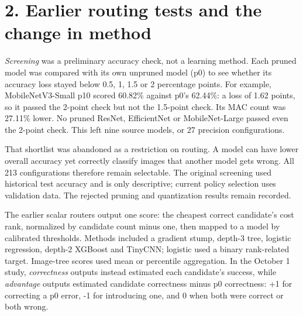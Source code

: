 \documentclass[10pt,a4paper]{article}
\newcommand{\pagehead}[1]{\section*{#1}}
\begin{document}
\newpage
\pagehead{2. Earlier routing tests and the change in method}
\textit{Screening} was a preliminary accuracy check, not a learning method. Each pruned model was compared with its own unpruned model (p0) to see whether its accuracy loss stayed below 0.5, 1, 1.5 or 2 percentage points. For example, MobileNetV3-Small p10 scored 60.82\% against p0's 62.44\%: a loss of 1.62 points, so it passed the 2-point check but not the 1.5-point check. Its MAC count was 27.11\% lower. No pruned ResNet, EfficientNet or MobileNet-Large passed even the 2-point check. This left nine source models, or 27 precision configurations.

That shortlist was abandoned as a restriction on routing. A model can have lower overall accuracy yet correctly classify images that another model gets wrong. All 213 configurations therefore remain selectable. The original screening used historical test accuracy and is only descriptive; current policy selection uses validation data. The rejected pruning and quantization results remain recorded.

The earlier scalar routers output one score: the cheapest correct candidate's cost rank, normalized by candidate count minus one, then mapped to a model by calibrated thresholds. Methods included a gradient stump, depth-3 tree, logistic regression, depth-2 XGBoost and TinyCNN; logistic used a binary rank-related target. Image-tree scores used mean or percentile aggregation. In the October 1 study, \emph{correctness} outputs instead estimated each candidate's success, while \emph{advantage} outputs estimated candidate correctness minus p0 correctness: +1 for correcting a p0 error, -1 for introducing one, and 0 when both were correct or both wrong.
\end{document}
